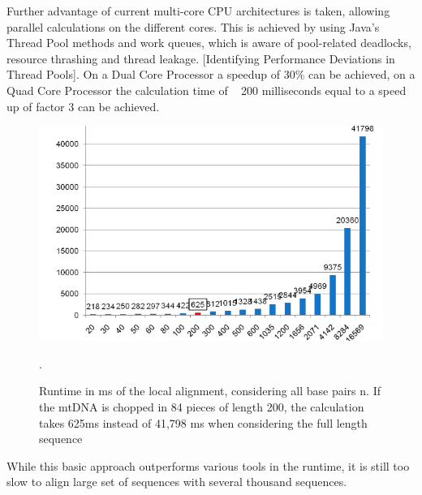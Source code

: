 Further advantage of current multi-core CPU architectures is taken, allowing parallel calculations on the different cores. This is achieved by using Java’s Thread Pool methods and work queues, which is aware of pool-related deadlocks, resource thrashing and thread leakage. [Identifying Performance Deviations in Thread Pools]. On a Dual Core Processor a speedup of 30\% can be achieved, on a Quad Core Processor the calculation time of ~ 200 milliseconds equal to a speed up of factor 3 can be achieved.
\begin{figure}[!ht]
\label{fig:local}
    \centering
    \includegraphics[width=1\textwidth]{images/runtimeSW.png}
    \caption[Runtime in ms of Gotoh for n/i ]{Runtime in ms of the local alignment, considering all base pairs n. If the mtDNA is chopped in 84 pieces of length 200, the calculation takes 625ms instead of 41,798 ms when considering the full length sequence}. 
\end{figure}
While this basic approach outperforms various tools in the runtime, it is still too slow to align large set of sequences with several thousand sequences. 

